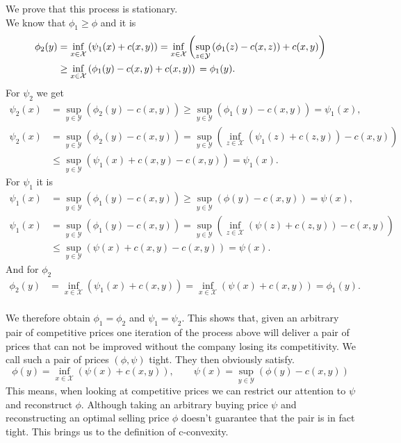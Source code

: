 \documentclass[11pt,a4paper]{article}
\begin{document}
We prove that this process is stationary.\vspace{2em}\\
We know that $\phi_1\geq\phi$ and it is 
\begin{align*}
\phi_2(y) & = \inf_{x\in\mathcal{X}}\left(\psi_1(x)+c(x,y)\right) = \inf_{x\in\mathcal{X}}\left(\sup_{z\in\mathcal{Y}}\left(\phi_1(z)-c(x,z)\right)+c(x,y)\right) \\
& \geq \inf_{x\in\mathcal{X}}\left(\phi_1(y)-c(x,y)+c(x,y)\right)\newline = \phi_1(y).
\end{align*}
For $\psi_2$ we get
\begin{align*}
\psi_2(x) & = \sup_{y\in\mathcal{Y}}\left(\phi_2(y)-c(x,y)\right) \geq \sup_{y\in\mathcal{Y}}\left(\phi_1(y)-c(x,y)\right) = \psi_1(x), \\
\psi_2(x) & = \sup_{y\in\mathcal{Y}}\left(\phi_2(y)-c(x,y)\right) = \sup_{y\in\mathcal{Y}}\left(\inf_{z\in\mathcal{X}}\left(\psi_1(z)+c(z,y)\right)-c(x,y)\right) \\ & \leq \sup_{y\in\mathcal{Y}}\left(\psi_1(x)+c(x,y)-c(x,y)\right) = \psi_1(x).
\end{align*}
\noindent For $\psi_1$ it is
\begin{align*}
\psi_1(x) & = \sup_{y\in\mathcal{Y}}\left(\phi_1(y)-c(x,y)\right) \geq \sup_{y\in\mathcal{Y}}\left(\phi(y)-c(x,y)\right) = \psi(x), \\
\psi_1(x) & = \sup_{y\in\mathcal{Y}}\left(\phi_1(y)-c(x,y)\right) = \sup_{y\in\mathcal{Y}}\left(\inf_{z\in\mathcal{X}}\left(\psi(z)+c(z,y)\right)-c(x,y)\right) \\& \leq  \sup_{y\in\mathcal{Y}}\left(\psi(x)+c(x,y)-c(x,y)\right) = \psi(x).
\end{align*}
And for $\phi_2$
\begin{align*}
\phi_2(y) & = \inf_{x\in\mathcal{X}}\left(\psi_1(x)+c(x,y)\right) = \inf_{x\in\mathcal{X}}\left(\psi(x)+c(x,y)\right) = \phi_1(y).  
\end{align*}
\vspace{1em}\\
\noindent We therefore obtain $\phi_1=\phi_2 $ and $\psi_1=\psi_2$. This shows that, given an arbitrary pair of competitive prices one iteration of the process above will deliver a pair of prices that can not be improved without the company losing its competitivity. We call such a pair of prices $(\phi,\psi)$ tight. They then obviously satisfy. 
\[
\phi(y) = \inf_{x\in\mathcal{X}}\left(\psi(x)+c(x,y)\right),\qquad \psi(x) = \sup_{y\in\mathcal{Y}}\left(\phi(y)-c(x,y)\right)
\]
This means, when looking at competitive prices we can restrict our attention to $\psi$ and reconstruct $\phi$. Although taking an arbitrary buying price $\psi$ and reconstructing an optimal selling price $\phi$ doesn't guarantee that the pair is in fact tight. This brings us to the definition of c-convexity.
\end{document}
